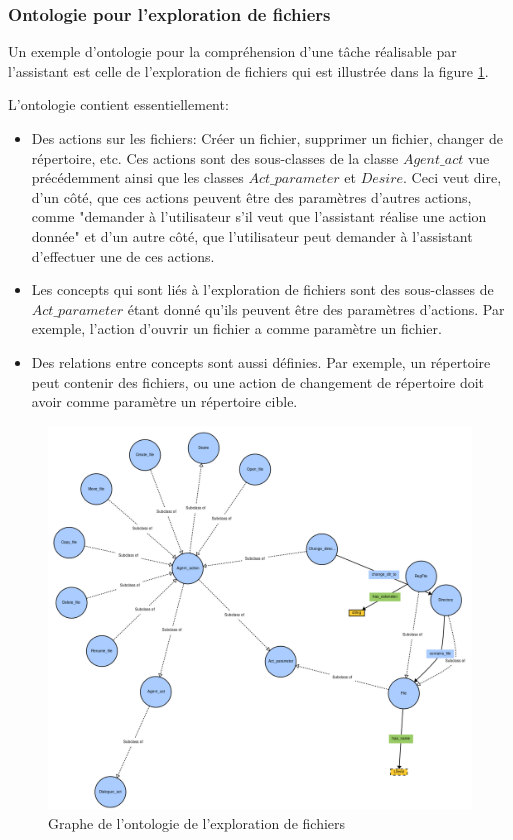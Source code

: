 \subsubsection*{Ontologie pour l'exploration de fichiers}\label{onto2}
Un exemple d'ontologie pour la compréhension d'une tâche réalisable par l'assistant est celle de l'exploration de fichiers qui est illustrée dans la figure \ref{onto_browser}.
\par
L'ontologie contient essentiellement:
\begin{itemize}
	\item Des actions sur les fichiers: Créer un fichier, supprimer un fichier, changer de répertoire, etc. Ces actions sont des sous-classes de la classe  $Agent\_act$ vue précédemment ainsi que les classes $Act\_parameter$ et $Desire$. Ceci veut dire, d'un côté, que ces actions peuvent être des paramètres d'autres actions, comme "demander à l'utilisateur s'il veut que l'assistant réalise une action donnée" et d'un autre côté, que l'utilisateur peut demander à l'assistant d'effectuer une de ces actions. 
	\item Les concepts qui sont liés à l'exploration de fichiers sont des sous-classes de $Act\_parameter$ étant donné qu'ils peuvent  être des paramètres d'actions. Par exemple, l'action d'ouvrir un fichier a comme paramètre un fichier.
	\item Des relations entre concepts sont aussi définies. Par exemple, un répertoire peut contenir des fichiers, ou une action de changement de répertoire doit avoir comme paramètre un répertoire cible.
\end{itemize}
\begin{figure}[H]
	
	\centering
	\includegraphics[width=1.1\linewidth]{images/Conception/DM/onto_browser.png}
	\caption{Graphe de l'ontologie de l'exploration de fichiers}\label{onto_browser}
\end{figure}

